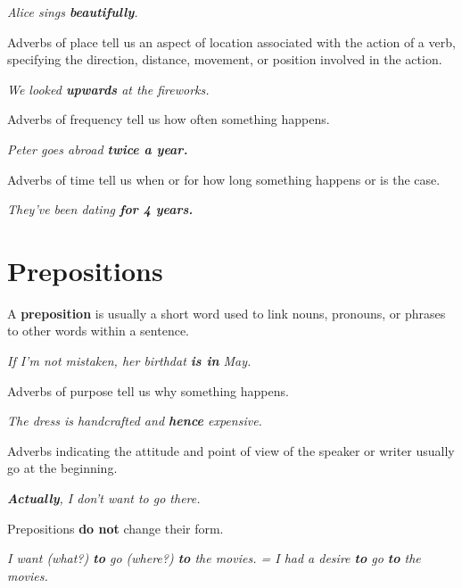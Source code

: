 \documentclass[hidelinks,10pt,a4paper]{article}
\begin{document}
\begin{center}
	\textit{Alice sings \textbf{beautifully}.}
\end{center}

Adverbs of place tell us an aspect of location associated with the action of a verb, specifying the direction, distance, movement, or position involved in the action.

\begin{center}
	\textit{We looked \textbf{upwards} at the fireworks.}
\end{center}

Adverbs of frequency tell us how often something happens.

\begin{center}
	\textit{Peter goes abroad \textbf{twice a year.} }
\end{center}

Adverbs of time tell us when or for how long something happens or is the case.

\begin{center}
	\textit{They've been dating \textbf{for 4 years.} }
\end{center}

\section{Prepositions}
A \textbf{preposition} is usually a short word used to link nouns, pronouns, or phrases to other words within a sentence.

\begin{center}
	\textit{If I'm not mistaken, her birthdat \textbf{is in} May. }
\end{center}

Adverbs of purpose tell us why something happens.

\begin{center}
	\textit{The dress is handcrafted and \textbf{hence} expensive. }
\end{center}

Adverbs indicating the attitude and point of view of the speaker or writer usually go at the beginning.

\begin{center}
	\textit{\textbf{Actually}, I don't want to go there.}
\end{center}

Prepositions \textbf{do not} change their form.

\begin{center}
	\textit{I want (what?) \textbf{to} go (where?) \textbf{to} the movies. =
	I had a desire \textbf{to} go \textbf{to} the movies.}
\end{center}
\end{document}
